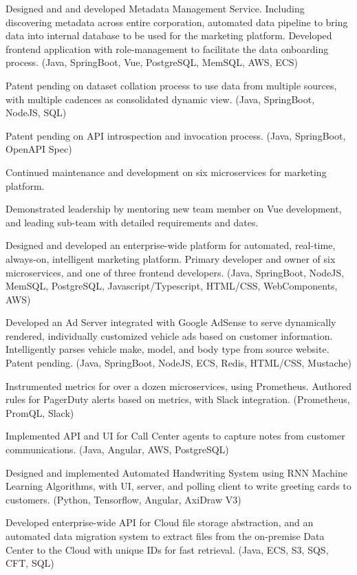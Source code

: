 \documentclass[a4paper]{deedy-resume-openfont} %
\begin{document}
\begin{tightemize}
\item Designed and and developed Metadata Management Service. Including discovering metadata across entire corporation, automated data pipeline to bring data into internal database to be used for the marketing platform. Developed frontend application with role-management to facilitate the data onboarding process. (Java, SpringBoot, Vue, PostgreSQL, MemSQL, AWS, ECS)
\item Patent pending on dataset collation process to use data from multiple sources, with multiple cadences as consolidated dynamic view. (Java, SpringBoot, NodeJS, SQL)
\item Patent pending on API introspection and invocation process. (Java, SpringBoot, OpenAPI Spec)
\item Continued maintenance and development on six microservices for marketing platform.
\item Demonstrated leadership by mentoring new team member on Vue development, and leading sub-team with detailed requirements and dates.
\end{tightemize}

\sectionsep %


\begin{tightemize}
\item Designed and developed an enterprise-wide platform for automated, real-time, always-on, intelligent marketing platform. Primary developer and owner of six microservices, and one of three frontend developers. (Java, SpringBoot, NodeJS, MemSQL, PostgreSQL, Javascript/Typescript, HTML/CSS, WebComponents, AWS)
\item Developed an Ad Server integrated with Google AdSense to serve dynamically rendered, individually customized vehicle ads based on customer information. Intelligently parses vehicle make, model, and body type from source website. Patent pending. (Java, SpringBoot, NodeJS, ECS, Redis, HTML/CSS, Mustache)
\item Instrumented metrics for over a dozen microservices, using Prometheus. Authored rules for PagerDuty alerts based on metrics, with Slack integration. (Prometheus, PromQL, Slack) 
\item Implemented API and UI for Call Center agents to capture notes from customer communications. (Java, Angular, AWS, PostgreSQL)
\item Designed and implemented Automated Handwriting System using RNN Machine Learning Algorithms, with UI, server, and polling client to write greeting cards to customers. (Python, Tensorflow, Angular, AxiDraw V3)
\item Developed enterprise-wide API for Cloud file storage abstraction, and an automated data migration system to extract files from the on-premise Data Center to the Cloud with unique IDs for fast retrieval. (Java, ECS, S3, SQS, CFT, SQL)
\end{tightemize}
\end{document}
